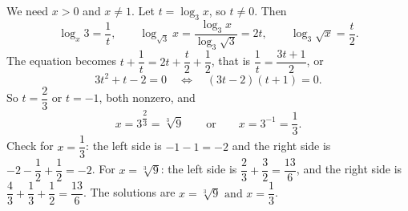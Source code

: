 We need $x>0$ and $x\ne1$. Let $t=\log_3x$, so $t\ne0$. Then
\[
\log_x3=\dfrac{1}{t},\qquad\log_{\sqrt3}x=\dfrac{\log_3x}{\log_3\sqrt3}=2t,\qquad\log_3\sqrt x=\dfrac {t}{2} .
\]
The equation becomes $t+\dfrac{1}{t}=2t+\dfrac {t}{2}+\dfrac{1}{2}$, that is $\dfrac{1}{t}=\dfrac{3t+1}{2}$, or
\[
3t^2+t-2=0\quad\Longleftrightarrow\quad(3t-2)(t+1)=0 .
\]
So $t=\dfrac{2}{3}$ or $t=-1$, both nonzero, and
\[
x=3^{\dfrac{2}{3}}=\sqrt[3]9\qquad\text{or}\qquad x=3^{-1}=\dfrac{1}{3} .
\]
Check for $x=\dfrac{1}{3}$: the left side is $-1-1=-2$ and the right side is $-2-\dfrac{1}{2}+\dfrac{1}{2}=-2$. For $x=\sqrt[3]9$: the left side is $\dfrac{2}{3}+\dfrac{3}{2}=\dfrac{13}{6}$, and the right side is $\dfrac{4}{3}+\dfrac{1}{3}+\dfrac{1}{2}=\dfrac{13}{6}$. The solutions are $\boxed{x=\sqrt[3]{9}\text{ and }x=\dfrac{1}{3}}$.
